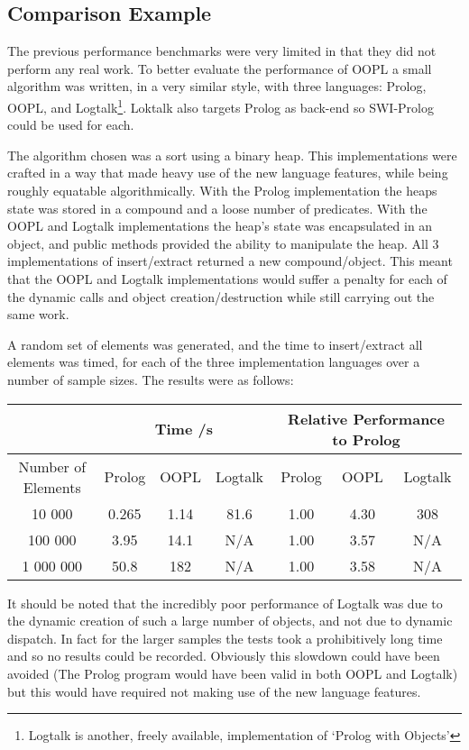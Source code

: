 \documentclass[12pt,a4paper,twoside,openright]{report}
\begin{document}
\subsection{Comparison Example}

The previous performance benchmarks were very limited in that they did not perform any real work. To better evaluate the performance of OOPL a small algorithm was written, in a very similar style, with three languages: Prolog, OOPL, and Logtalk\footnote{Logtalk is another, freely available, implementation of `Prolog with Objects'}. Loktalk also targets Prolog as back-end so SWI-Prolog could be used for each.

\bigskip

The algorithm chosen was a sort using a binary heap. This implementations were crafted in a way that made heavy use of the new language features, while being roughly equatable algorithmically. With the Prolog implementation the heaps state was stored in a compound and a loose number of predicates. With the OOPL and Logtalk implementations the heap's state was encapsulated in an object, and public methods provided the ability to manipulate the heap. All 3 implementations of insert/extract returned a new compound/object. This meant that the OOPL and Logtalk implementations would suffer a penalty for each of the dynamic calls and object creation/destruction while still carrying out the same work.

\bigskip

A random set of elements was generated, and the time to insert/extract all elements was timed, for each of the three implementation languages over a number of sample sizes. The results were as follows:

\begin{center}
\begin{tabular}{c|c|c|c|c|c|c}
 & \multicolumn{3}{c}{Time /s} &  \multicolumn{3}{c}{Relative Performance to Prolog}\\
 \hline
Number of Elements 	& Prolog & OOPL & Logtalk & Prolog & OOPL & Logtalk \\
\hline
 10 000				& 0.265	& 1.14	& 81.6 & 1.00	& 4.30	& 308		\\
 100 000			& 3.95	& 14.1	& N/A  & 1.00	& 3.57	& N/A		\\
 1 000 000			& 50.8	&182 	& N/A  & 1.00	& 3.58	& N/A		\\
\end{tabular}
\end{center}

It should be noted that the incredibly poor performance of Logtalk was due to the dynamic creation of such a large number of objects, and not due to dynamic dispatch. In fact for the larger samples the tests took a prohibitively long time and so no results could be recorded. Obviously this slowdown could have been avoided (The Prolog program would have been valid in both OOPL and Logtalk) but this would have required not making use of the new language features.
\end{document}
